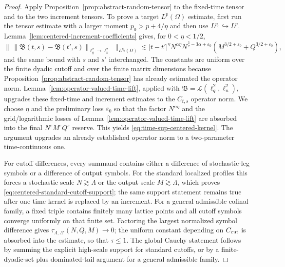 \documentclass[10pt]{amsart}
\numberwithin{equation}{section}
\theoremstyle{plain}
\theoremstyle{definition}
\theoremstyle{remark}
\newcommand{\eps}{\varepsilon}
\begin{document}
\begin{proof}
Apply Proposition~\ref{prop:abstract-random-tensor} to the fixed-time tensor and to the two increment tensors.  To prove a target $L^p(\Omega)$ estimate, first run the tensor estimate with a larger moment $p_0>p+4/\eta$ and then use $L^{p_0}\hookrightarrow L^p$.  Lemma~\ref{lem:centered-increment-coefficients} gives, for $0<\eta<1/2$,
\[
\bigl\|\,\|\mathfrak B(t,s)-\mathfrak B(t',s)\|_{\ell^2_q\to\ell^2_n}\,\bigr\|_{L^{p_0}(\Omega)}
\lesssim
|t-t'|^\eta N^{\alpha\eta}
N^{\frac32-3\alpha+\eps_0}(M^{3/2+\eps_0}+Q^{3/2+\eps_0}),
\]
and the same bound with $s$ and $s'$ interchanged.  The constants are uniform over the finite dyadic cutoff and over the finite matrix dimensions because Proposition~\ref{prop:abstract-random-tensor} has already estimated the operator norm.  Lemma~\ref{lem:operator-valued-time-lift}, applied with ${\mathfrak B}=\mathcal L(\ell_q^2,\ell_n^2)$, upgrades these fixed-time and increment estimates to the $C_{t,s}$ operator norm.  We choose $\eta$ and the preliminary loss $\eps_0$ so that the factor $N^{\alpha\eta}$ and the grid/logarithmic losses of Lemma~\ref{lem:operator-valued-time-lift} are absorbed into the final $N^\eps M^\eps Q^\eps$ reserve.  This yields \eqref{eq:time-sup-centered-kernel}.  The argument upgrades an already established operator norm to a two-parameter time-continuous one.

For cutoff differences, every summand contains either a difference of stochastic-leg symbols or a difference of output symbols.  For the standard localized profiles this forces a stochastic scale $N\gtrsim\Lambda$ or the output scale $M\gtrsim\Lambda$, which proves \eqref{eq:centered-standard-cutoff-support}; the same support statement remains true after one time kernel is replaced by an increment.  For a general admissible cofinal family, a fixed triple contains finitely many lattice points and all cutoff symbols converge uniformly on that finite set.  Factoring the largest normalized symbol difference gives $\tau_{\Lambda,\Lambda'}(N,Q,M)\to0$; the uniform constant depending on $C_{\rm cut}$ is absorbed into the estimate, so that $\tau\le1$.  The global Cauchy statement follows by summing the explicit high-scale support for standard cutoffs, or by a finite-dyadic-set plus dominated-tail argument for a general admissible family.
\end{proof}
\end{document}
